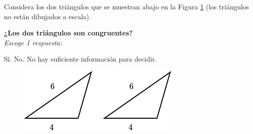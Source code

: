 Considera los dos triángulos que se muestran abajo en la Figura \ref{fig:20230323154049} (los triángulos no están dibujados a escala).

\begin{minipage}{0.6\textwidth}
    \textbf{¿Los dos triángulos son congruentes?}\\
    \emph{Escoge 1 respuesta:}\\
    \begin{choices}
        \choice Sí.
        \choice No.
        \CorrectChoice No hay suficiente información para decidir.
    \end{choices}
\end{minipage}%
\begin{minipage}{0.35\textwidth}
    \begin{figure}[H]
        \centering
        \includegraphics[width=\linewidth]{../images/20230323154049}
        \caption{}
        \label{fig:20230323154049}
    \end{figure}
\end{minipage}

